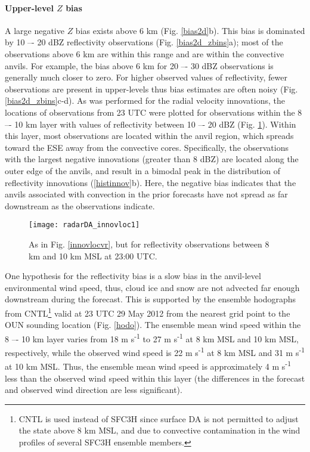 \paragraph{Upper-level \(Z\) bias}
A large negative \(Z\) bias exists above 6 km (Fig. \ref{bias2d}b). This bias is dominated by 10 –- 20 dBZ reflectivity observations (Fig. \ref{bias2d_zbins}a); most of the observations above 6 km are within this range and are within the convective anvils. For example, the bias above 6 km for 20 –- 30 dBZ observations is generally much closer to zero. For higher observed values of reflectivity, fewer observations are present in upper-levels thus bias estimates are often noisy (Fig. \ref{bias2d_zbins}c-d). As was performed for the radial velocity innovations, the locations of observations from 23 UTC were plotted for observations within the 8 –- 10 km layer with values of reflectivity between 10 –- 20 dBZ (Fig. \ref{vrinnov}). Within this layer, most observations are located within the anvil region, which spreads toward the ESE away from the convective cores. Specifically, the observations with the largest negative innovations (greater than 8 dBZ) are located along the outer edge of the anvils, and result in a bimodal peak in the distribution of reflectivity innovations (\ref{histinnov}b). Here, the negative bias indicates that the anvils associated with convection in the prior forecasts have not spread as far downstream as the observations indicate.

\begin{figure}
\centering
\texttt{[image: radarDA\_innovloc1]}
\caption{As in Fig. \ref{innovlocvr}, but for reflectivity observations between 8 km and 10 km MSL at 23:00 UTC.}
\label{vrinnov}
\end{figure}

One hypothesis for the reflectivity bias is a slow bias in the anvil-level environmental wind speed, thus, cloud ice and snow are not advected far enough downstream during the forecast. This is supported by the ensemble hodographs from CNTL\footnote{CNTL is used instead of SFC3H since surface DA is not permitted to adjust the state above 8 km MSL, and due to convective contamination in the wind profiles of several SFC3H ensemble members.} valid at 23 UTC 29 May 2012 from the nearest grid point to the OUN sounding location (Fig. \ref{hodo}). The ensemble mean wind speed within the 8 –- 10 km layer varies from 18 m s\textsuperscript{-1} to 27 m s\textsuperscript{-1} at 8 km MSL and 10 km MSL, respectively, while the observed wind speed is 22 m s\textsuperscript{-1} at 8 km MSL and 31 m s\textsuperscript{-1} at 10 km MSL. Thus, the ensemble mean wind speed is approximately 4 m s\textsuperscript{-1} less than the observed wind speed within this layer (the differences in the forecast and observed wind direction are less significant). 

